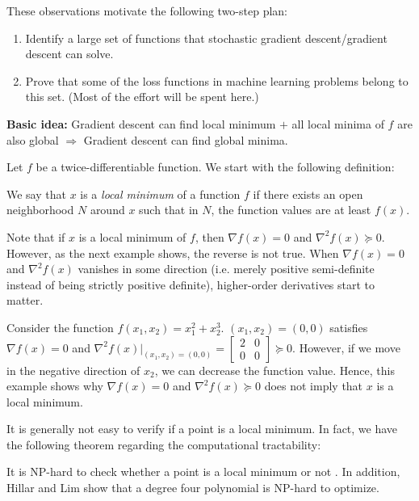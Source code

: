 These observations motivate the following two-step plan:

\begin{enumerate}
    \item Identify a large set of functions that stochastic gradient descent/gradient descent can solve.
    \item Prove that some of the loss functions in machine learning problems belong to this set. (Most of the effort will be spent here.)
\end{enumerate}
\textbf{Basic idea:} Gradient descent can find local minimum $+$ all local minima of $f$ are also global $\Rightarrow$ Gradient descent can find global minima.

Let $f$ be a twice-differentiable function. We start with the following definition:
\begin{definition} 
We say that $x$ is a \textit{local minimum} of a function $f$ if there exists an open neighborhood $N$ around $x$ such that in $N$, the function values are at least $f(x)$.
\end{definition}

Note that if $x$ is a local minimum of $f$, then $\nabla f(x) = 0$ and $\nabla^2 f(x) \succeq 0$. However, as the next example shows, the reverse is not true. When $\nabla f(x) = 0$ and $\nabla^2 f(x)$ vanishes in some direction (i.e. merely positive semi-definite instead of being strictly positive definite), higher-order derivatives start to matter.

\begin{example}
\label{lec10:ex:counterexample}
Consider the function $f(x_1, x_2) = x_1^2 + x_2^3$. $(x_1, x_2) = (0, 0)$ satisfies $\nabla f(x) = 0$ and $\nabla^2 f(x)|_{(x_1, x_2) = (0, 0)} = \begin{bmatrix} 2 & 0 \\
0 & 0\end{bmatrix} \succeq 0$. However, if we move in the negative direction of $x_2$, we can decrease the function value. Hence, this example shows why $\nabla f(x) = 0$ and $\nabla^2 f(x) \succeq 0$ does not imply that $x$ is a local minimum.
\end{example}

It is generally not easy to verify if a point is a local minimum. In fact, we have the following theorem regarding the computational tractability:
\begin{theorem}
\label{lec10:thm:np_hard}
It is NP-hard to check whether a point is a local minimum or not \cite{murty1987}. In addition, Hillar and Lim \cite{hillar2013} show that a degree four polynomial is NP-hard to optimize.
\end{theorem}

